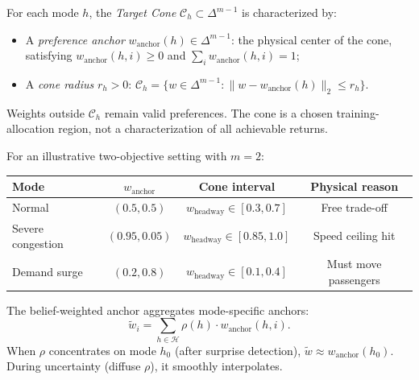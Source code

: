 \begin{definition}
\label{def:target_cone}
For each mode $h$, the \emph{Target Cone} $\mathcal{C}_h \subset \Delta^{m-1}$ is characterized by:
\begin{itemize}
    \item A \emph{preference anchor} $w_{\mathrm{anchor}}(h) \in \Delta^{m-1}$: the physical center of the cone, satisfying $w_{\mathrm{anchor}}(h,i) \ge 0$ and $\sum_i w_{\mathrm{anchor}}(h,i) = 1$;
    \item A \emph{cone radius} $r_h > 0$: $\mathcal{C}_h = \{w \in \Delta^{m-1} : \|w - w_{\mathrm{anchor}}(h)\|_2 \le r_h\}$.
\end{itemize}
Weights outside $\mathcal{C}_h$ remain valid preferences. The cone is a chosen training-allocation region, not a characterization of all achievable returns.
\end{definition}

\begin{example}
\label{ex:cones}
For an illustrative two-objective setting with $m=2$:
\begin{center}
\begin{tabular}{lccc}
\toprule
\textbf{Mode} & $w_{\mathrm{anchor}}$ & \textbf{Cone interval} & \textbf{Physical reason} \\
\midrule
Normal & $(0.5, 0.5)$ & $w_{\mathrm{headway}} \in [0.3, 0.7]$ & Free trade-off \\
Severe congestion & $(0.95, 0.05)$ & $w_{\mathrm{headway}} \in [0.85, 1.0]$ & Speed ceiling hit \\
Demand surge & $(0.2, 0.8)$ & $w_{\mathrm{headway}} \in [0.1, 0.4]$ & Must move passengers \\
\bottomrule
\end{tabular}
\end{center}
\end{example}

\begin{definition}
\label{def:belief_anchor}
The belief-weighted anchor aggregates mode-specific anchors:
\begin{equation}
    \tilde{w}_i = \sum_{h \in \mathcal{H}} \rho(h) \cdot w_{\mathrm{anchor}}(h, i).
    \label{eq:belief_anchor}
\end{equation}
When $\rho$ concentrates on mode $h_0$ (after surprise detection), $\tilde{w} \approx w_{\mathrm{anchor}}(h_0)$.  During uncertainty (diffuse $\rho$), it smoothly interpolates.
\end{definition}

